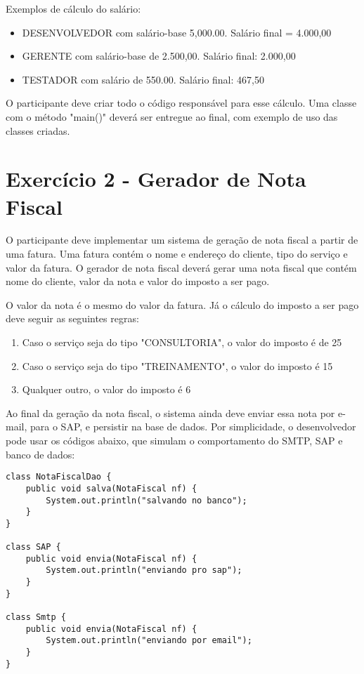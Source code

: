 Exemplos de cálculo do salário:

\begin{itemize}
	\item DESENVOLVEDOR com salário-base 5,000.00. Salário final = 4.000,00
	\item GERENTE com salário-base de 2.500,00. Salário final: 2.000,00
	\item TESTADOR com salário de 550.00. Salário final: 467,50
\end{itemize}


O participante deve criar todo o código responsável para esse cálculo. Uma classe com
o método "main()" deverá ser entregue ao final, com exemplo de uso das classes criadas.

\section{Exercício 2 - Gerador de Nota Fiscal}

O participante deve implementar um sistema de geração de nota fiscal a partir de uma fatura. 
Uma fatura contém o nome e endereço do cliente, tipo do serviço e valor da fatura. O gerador de
nota fiscal deverá gerar uma nota fiscal que contém nome do cliente, valor da nota e valor
do imposto a ser pago.

O valor da nota é o mesmo do valor da fatura. Já o cálculo do imposto a ser pago deve seguir
as seguintes regras:

\begin{enumerate}
	\item Caso o serviço seja do tipo "CONSULTORIA", o valor do imposto é de 25%
	\item Caso o serviço seja do tipo "TREINAMENTO", o valor do imposto é 15%
	\item Qualquer outro, o valor do imposto é 6%
\end{enumerate}

Ao final da geração da nota fiscal, o sistema ainda deve enviar essa nota por e-mail,
para o SAP, e persistir na base de dados. Por simplicidade, o desenvolvedor pode usar
os códigos abaixo, que simulam o comportamento do SMTP, SAP e banco de dados:

\begin{lstlisting}
class NotaFiscalDao {
	public void salva(NotaFiscal nf) { 
		System.out.println("salvando no banco"); 
	}
}

class SAP {
	public void envia(NotaFiscal nf) { 
		System.out.println("enviando pro sap"); 
	}
}

class Smtp {
	public void envia(NotaFiscal nf) { 
		System.out.println("enviando por email"); 
	}
}
\end{lstlisting}

